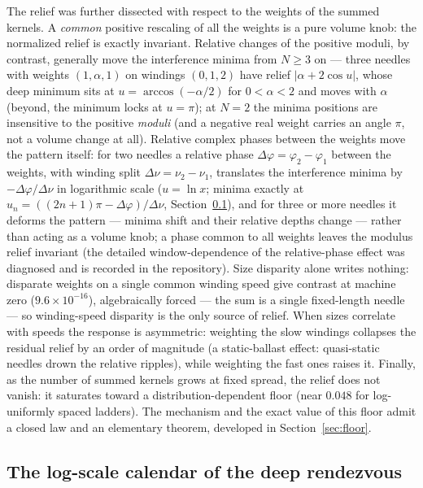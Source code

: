 \documentclass[11pt,a4paper]{article}
\begin{document}
The relief was further dissected with respect to the weights of the
summed kernels. A \emph{common} positive rescaling of all the weights is a
pure volume knob: the normalized relief is exactly invariant. Relative
changes of the positive moduli, by contrast, generally move the
interference minima from $N \geq 3$ on --- three needles with weights
$(1, \alpha, 1)$ on windings $(0, 1, 2)$ have relief $|\alpha + 2\cos u|$,
whose deep minimum sits at $u = \arccos(-\alpha/2)$ for
$0 < \alpha < 2$ and moves with $\alpha$ (beyond, the minimum locks at
$u = \pi$); at $N = 2$ the minima positions are insensitive to the
positive \emph{moduli} (and a negative real weight carries an angle $\pi$,
not a volume change at all). Relative complex phases between the weights move the pattern
itself: for two needles a relative phase $\Delta\varphi = \varphi_2 -
\varphi_1$ between the weights, with winding split $\Delta\nu = \nu_2 -
\nu_1$, translates the
interference minima by $-\Delta\varphi/\Delta\nu$ in logarithmic scale
($u = \ln x$; minima exactly at
$u_n = ((2n+1)\pi - \Delta\varphi)/\Delta\nu$, Section~\ref{sec:calendar}), and for three or more needles it
deforms the pattern --- minima shift and their relative depths change ---
rather than acting as a volume knob; a phase common to all weights
leaves the modulus relief invariant (the detailed window-dependence of the
relative-phase effect was diagnosed and is recorded in the repository). Size disparity alone
writes nothing: disparate weights on a single common winding speed give
contrast at machine zero ($9.6\times10^{-16}$), algebraically forced ---
the sum is a single fixed-length needle --- so winding-speed disparity
is the only source of relief. When sizes correlate with speeds the
response is asymmetric: weighting the slow windings collapses the
residual relief by an order of magnitude (a static-ballast effect:
quasi-static needles drown the relative ripples), while weighting the
fast ones raises it. Finally, as the number of summed kernels grows at
fixed spread, the relief does not vanish: it saturates toward a
distribution-dependent floor (near $0.048$ for log-uniformly spaced
ladders). The mechanism and the exact value of this floor admit a
closed law and an elementary theorem, developed in
Section~\ref{sec:floor}.

\subsection{The log-scale calendar of the deep rendezvous}
\label{sec:calendar}
\end{document}
